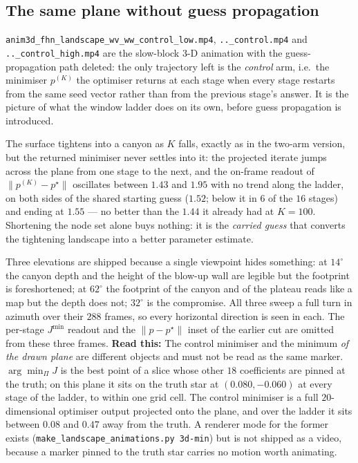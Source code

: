 \documentclass[10pt]{article}
\newcommand{\readthis}[1]{\textbf{Read this:} #1}
\begin{document}
\subsection{The same plane without guess propagation}
\texttt{anim3d\_fhn\_landscape\_wv\_ww\_control\_low.mp4}, \texttt{..\_control.mp4} and \texttt{..\_control\_high.mp4} are the slow-block 3-D animation
with the guess-propagation path deleted: the only trajectory left is the \emph{control} arm, i.e.\ the
minimiser $p^{(K)}$ the optimiser returns at each stage when every stage restarts from the same seed
vector rather than from the previous stage's answer. It is the picture of what the window ladder does
on its own, before guess propagation is introduced.

The surface tightens into a canyon as $K$ falls, exactly as in the two-arm version, but the returned
minimiser never settles into it: the projected iterate jumps across the plane from one stage to the
next, and the on-frame readout of $\lVert p^{(K)}-p^\star\rVert$ oscillates between $1.43$ and $1.95$
with no trend along the ladder, on both sides of the shared starting guess ($1.52$; below it in $6$ of
the $16$ stages) and ending at $1.55$ --- no better than the $1.44$ it already had at $K=100$.
Shortening the node set alone buys nothing: it is the \emph{carried guess} that converts the
tightening landscape into a better parameter estimate.

Three elevations are shipped because a single viewpoint hides something: at $14^\circ$ the canyon
depth and the height of the blow-up wall are legible but the footprint is foreshortened; at $62^\circ$
the footprint of the canyon and of the plateau reads like a map but the depth does not; $32^\circ$ is
the compromise. All three sweep a full turn in azimuth over their $288$ frames, so every horizontal
direction is seen in each. The per-stage $J^{\min}$ readout and the $\lVert p-p^\star\rVert$ inset of
the earlier cut are omitted from these three frames.
\readthis{The control minimiser and the minimum \emph{of the drawn plane} are different objects and
must not be read as the same marker. $\arg\min_\Pi J$ is the best point of a slice whose other $18$
coefficients are pinned at the truth; on this plane it sits on the truth star at $(0.080,-0.060)$ at
every stage of the ladder, to within one grid cell. The control minimiser is a full $20$-dimensional
optimiser output projected onto the plane, and over the ladder it sits between $0.08$ and $0.47$ away
from the truth. A renderer mode for the former exists
(\texttt{make\_landscape\_animations.py 3d-min}) but is not shipped as a video, because a marker
pinned to the truth star carries no motion worth animating.}
\end{document}

